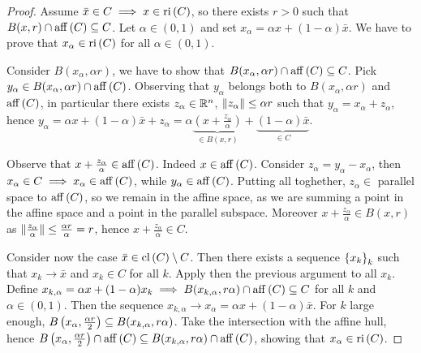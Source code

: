 \begin{proof}
    
    Assume $\bar{x} \in C \implies x \in \mathrm{ri}\left(C\right)$, so there exists $r > 0$ such that $B(x,r) \cap \mathrm{aff}\left(C\right) \subseteq C$. Let $\alpha \in (0,1)$ and set $x_\alpha = \alpha x + (1-\alpha)\bar{x}$. We have to prove that $x_\alpha \in \mathrm{ri}\left(C\right)$ for all $\alpha \in (0,1)$. 

    Consider $B(x_\alpha,\alpha r)$, we have to show that $B(x_\alpha, \alpha r) \cap \mathrm{aff}\left(C\right) \subseteq C$. Pick $y_\alpha \in B(x_\alpha, \alpha r) \cap \mathrm{aff}\left(C\right)$. Observing that $y_\alpha$ belongs both to $B(x_\alpha, \alpha r)$ and $\mathrm{aff}\left(C\right)$, in particular there exists $z_\alpha \in {\mathbb{R}^n}$, $\lVert z_\alpha \rVert \le \alpha r$ such that $y_\alpha = x_\alpha + z_\alpha$, hence $y_\alpha = \alpha x + (1-\alpha)\bar{x} + z_\alpha = \alpha\underbrace{\left(x + \frac{z_\alpha}{\alpha}\right)}_{\in B(x,r)} + \underbrace{(1-\alpha)\bar{x}}_{\in C}$. 

    Observe that $x + \frac{z_\alpha}{\alpha} \in \mathrm{aff}\left(C\right)$. Indeed $x \in \mathrm{aff}\left(C\right)$. Consider $z_\alpha = y_\alpha - x_\alpha$, then $x_\alpha \in C \implies x_\alpha \in \mathrm{aff}\left(C\right)$, while $y_\alpha \in \mathrm{aff}\left(C\right)$. Putting all toghether, $z_\alpha \in$ parallel space to $\mathrm{aff}\left(C\right)$, so we remain in the affine space, as we are summing a point in the affine space and a point in the parallel subspace. Moreover $x + \frac{z_\alpha}{\alpha} \in B(x,r)$ as $\lVert \frac{z_\alpha}{\alpha} \rVert \le \frac{\alpha r}{\alpha} = r$, hence $ x + \frac{z_\alpha}{\alpha} \in C$. 

    Consider now the case $\bar{x} \in \mathrm{cl}\left(C\right) \setminus C$. Then there exists a sequence $\left\{ x_k \right\}_k$ such that $x_k \to \bar{x}$ and $x_k \in C$ for all $k$. Apply then the previous argument to all $x_k$. Define $x_{k,\alpha} = \alpha x + (1-\alpha)x_k \implies B(x_{k,\alpha},r\alpha) \cap \mathrm{aff}\left(C\right) \subseteq C$ for all $k$ and $\alpha \in (0,1)$. Then the sequence $x_{k,\alpha} \to x_\alpha = \alpha x + (1-\alpha)\bar{x}$. For $k$ large enough, $B\left(x_\alpha,\frac{\alpha r}{2}\right) \subseteq B(x_{k,\alpha},r\alpha)$. Take the intersection with the affine hull, hence $B\left(x_\alpha,\frac{\alpha r}{2}\right) \cap \mathrm{aff}\left(C\right) \subseteq B(x_{k,\alpha},r\alpha) \cap \mathrm{aff}\left(C\right)$, showing that $x_\alpha \in \mathrm{ri}\left(C\right)$.

\end{proof}
